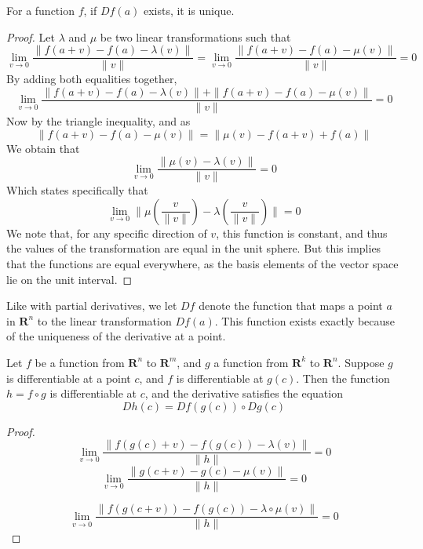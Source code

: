 \begin{theorem}
  For a function $f$, if $Df(a)$ exists, it is unique.
\end{theorem}
\begin{proof}
  Let $\lambda$ and $\mu$ be two linear transformations such that
  \[ \lim_{v \to 0} \frac{\|f(a + v) - f(a) - \lambda(v)\|}{\|v\|} = \lim_{v \to 0} \frac{\|f(a + v) - f(a) - \mu(v)\|}{\|v\|} = 0 \]
  By adding both equalities together,
  \[ \lim_{v \to 0} \frac{\|f(a + v) - f(a) - \lambda(v)\| + \|f(a + v) - f(a) - \mu(v)\|}{\|v\|} = 0 \]
  Now by the triangle inequality, and as
  \[ \|f(a + v) - f(a) - \mu(v)\| = \|\mu(v) - f(a + v) + f(a)\| \]
  We obtain that
  \[ \lim_{v \to 0} \frac{\|\mu(v) - \lambda(v)\|}{\|v\|} = 0 \]
  Which states specifically that
  \[ \lim_{v \to 0} \|\mu(\frac{v}{\|v\|}) - \lambda(\frac{v}{\|v\|})\| = 0 \]
  We note that, for any specific direction of $v$, this function is constant, and thus the values of the transformation are equal in the unit sphere. But this implies that the functions are equal everywhere, as the basis elements of the vector space lie on the unit interval.
\end{proof}

Like with partial derivatives, we let $Df$ denote the function that maps a point $a$ in $\mathbf{R}^n$ to the linear transformation $Df(a)$. This function exists exactly because of the uniqueness of the derivative at a point.

\begin{theorem}
  Let $f$ be a function from $\mathbf{R}^n$ to $\mathbf{R}^m$, and $g$ a function from $\mathbf{R}^k$ to $\mathbf{R}^n$. Suppose $g$ is differentiable at a point $c$, and $f$ is differentiable at $g(c)$. Then the function $h = f \circ g$ is differentiable at $c$, and the derivative satisfies the equation
  \[ Dh(c) = Df(g(c)) \circ Dg(c) \]
\end{theorem}
\begin{proof}
  \[ \lim_{v \to 0} \frac{\|f(g(c) + v) - f(g(c)) - \lambda(v)\|}{\|h\|} = 0 \]
  \[ \lim_{v \to 0} \frac{\|g(c + v) - g(c) - \mu(v)\|}{\|h\|} = 0 \]

  \[ \lim_{v \to 0} \frac{\| f(g(c + v)) - f(g(c)) - \lambda \circ \mu (v)\|}{\|h\|} = 0 \]
\end{proof}










